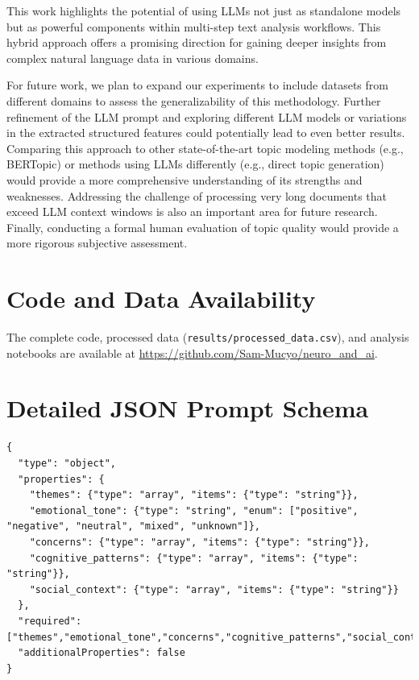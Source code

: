 \documentclass{article}
\begin{document}
This work highlights the potential of using LLMs not just as standalone models but as powerful components within multi-step text analysis workflows. This hybrid approach offers a promising direction for gaining deeper insights from complex natural language data in various domains.

For future work, we plan to expand our experiments to include datasets from different domains to assess the generalizability of this methodology. Further refinement of the LLM prompt and exploring different LLM models or variations in the extracted structured features could potentially lead to even better results. Comparing this approach to other state-of-the-art topic modeling methods (e.g., BERTopic) or methods using LLMs differently (e.g., direct topic generation) would provide a more comprehensive understanding of its strengths and weaknesses. Addressing the challenge of processing very long documents that exceed LLM context windows is also an important area for future research. Finally, conducting a formal human evaluation of topic quality would provide a more rigorous subjective assessment.




\section*{Code and Data Availability}
The complete code, processed data (\texttt{results/processed\_data.csv}), and analysis notebooks are available at \url{https://github.com/Sam-Mucyo/neuro_and_ai}.

\appendix
\section{Detailed JSON Prompt Schema}
\label{app:prompt-schema}
\begin{verbatim}
{
  "type": "object",
  "properties": {
    "themes": {"type": "array", "items": {"type": "string"}},
    "emotional_tone": {"type": "string", "enum": ["positive", "negative", "neutral", "mixed", "unknown"]},
    "concerns": {"type": "array", "items": {"type": "string"}},
    "cognitive_patterns": {"type": "array", "items": {"type": "string"}},
    "social_context": {"type": "array", "items": {"type": "string"}}
  },
  "required": ["themes","emotional_tone","concerns","cognitive_patterns","social_context"],
  "additionalProperties": false
}
\end{verbatim}
\end{document}
